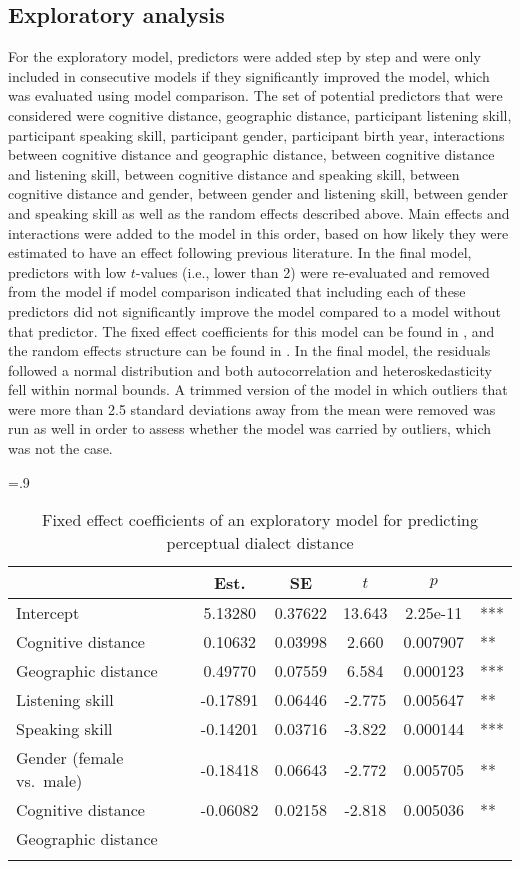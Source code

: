 \documentclass[output=paper,colorlinks,citecolor=brown,draft]{langscibook}
\begin{document}
\subsection{Exploratory analysis}
For the exploratory model, predictors were added step by step and were only included in consecutive models if they significantly improved the model, which was evaluated using model comparison. The set of potential predictors that were considered were cognitive distance, geographic distance, participant listening skill, participant speaking skill, participant gender, participant birth year, interactions between cognitive distance and geographic distance, between cognitive distance and listening skill, between cognitive distance and speaking skill, between cognitive distance and gender, between gender and listening skill, between gender and speaking skill as well as the random effects described above. Main effects and interactions were added to the model in this order, based on how likely they were estimated to have an effect following previous literature. In the final model, predictors with low $t$-values (i.e., lower than 2) were re-evaluated and removed from the model if model comparison indicated that including each of these predictors did not significantly improve the model compared to a model without that predictor. 
The fixed effect coefficients for this model can be found in , and the random effects structure can be found in . In the final model, the residuals followed a normal distribution and both autocorrelation and heteroskedasticity fell within normal bounds. A trimmed version of the model in which outliers that were more than 2.5 standard deviations away from the mean were removed was run as well in order to assess whether the model was carried by outliers, which was not the case. 

\begin{table}
\caption{Fixed effect coefficients of an exploratory model for predicting perceptual dialect distance}
\label{tab:fec_exp}
\tabcolsep=.9\tabcolsep
 \begin{tabular}{l S[table-format=-1.5] S[table-format=1.5] S[table-format=-2.3] S[table-format=1.2e2, table-align-exponent=false] l}
  \lsptoprule
    & {Est.} & {SE}  & {$t$} & {$p$} & \\
  \midrule
    Intercept & 5.13280 & 0.37622 & 13.643 & 2.25e-11 & ***\\
    Cognitive distance & 0.10632 & 0.03998 & 2.660 & 0.007907 & **\\
    Geographic distance	& 0.49770 & 0.07559 & 6.584 & 0.000123 & ***\\
    Listening skill & -0.17891 & 0.06446 & -2.775 & 0.005647 & ** \\
    Speaking skill & -0.14201 & 0.03716 & -3.822 & 0.000144 & ***\\
    Gender (female vs.\ male)	& -0.18418 & 0.06643 & -2.772 & 0.005705 & **\\
    Cognitive distance & -0.06082 & 0.02158 & -2.818 & 0.005036 & **\\
    Geographic distance	& & & & & \\
  \lspbottomrule
 \end{tabular}
\end{table}
\end{document}
